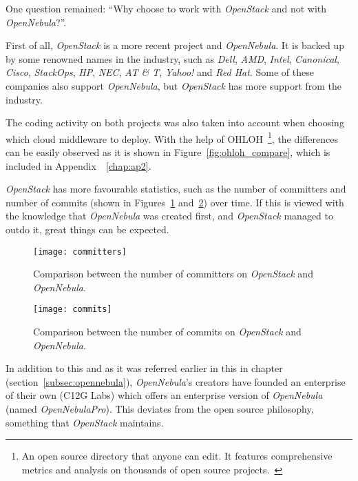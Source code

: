 One question remained: ``Why choose to work with \textit{OpenStack} and not with \textit{OpenNebula}?''.

First of all, \textit{OpenStack} is a more recent project and \textit{OpenNebula}. It is backed up by some renowned names in the industry, such as \textit{Dell}, \textit{AMD}, \textit{Intel}, \textit{Canonical}, \textit{Cisco}, \textit{StackOps}, \textit{HP}, \textit{NEC}, \textit{AT \& T}, \textit{Yahoo!} and \textit{Red Hat}. Some of these companies also support \textit{OpenNebula}, but \textit{OpenStack} has more support from the industry.

The coding activity on both projects was also taken into account when choosing which cloud middleware to deploy. With the help of OHLOH~\footnote{An open source directory that anyone can edit. It features comprehensive metrics and analysis on thousands of open source projects.~\cite{ohloh}}, the differences can be easily observed as it is shown in Figure~\ref{fig:ohloh_compare}, which is included in Appendix~~\ref{chap:ap2}.

\textit{OpenStack} has more favourable statistics, such as the number of committers and number of commits (shown in Figures~\ref{fig:committers} and~\ref{fig:commits}) over time. If this is viewed with the knowledge that \textit{OpenNebula} was created first, and \textit{OpenStack} managed to outdo it, great things can be expected.

\begin{figure}[h]
  \begin{center} 
    \leavevmode 
    \texttt{[image: committers]}
    \caption{Comparison between the number of committers on \textit{OpenStack} and \textit{OpenNebula}.~\cite{ohloh}} 
    \label{fig:committers} 
  \end{center}
\end{figure}

\begin{figure}[h]
  \begin{center}
    \leavevmode
    \texttt{[image: commits]}
    \caption{Comparison between the number of commits on \textit{OpenStack} and \textit{OpenNebula}.~\cite{ohloh}}
    \label{fig:commits}
  \end{center}
\end{figure}

In addition to this and as it was referred earlier in this in chapter (section~\ref{subsec:opennebula}), \textit{OpenNebula}'s creators have founded an enterprise of their own (C12G Labs) which offers an enterprise version of \textit{OpenNebula} (named \textit{OpenNebulaPro}). This deviates from the open source philosophy, something that \textit{OpenStack} maintains.

